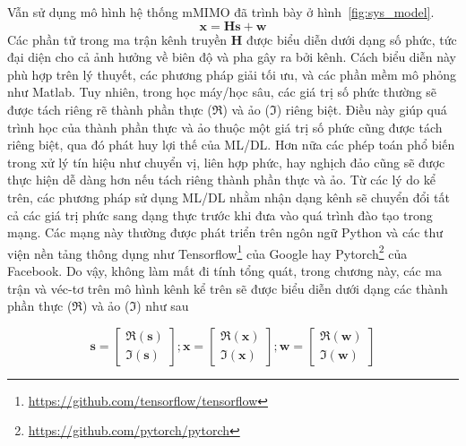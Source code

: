 Vẫn sử dụng mô hình hệ thống mMIMO đã trình bày ở hình~\ref{fig:sys_model}.
\begin{equation}
    \mathbf{x} = \mathbf{H} \mathbf{s} + \mathbf{w}
\end{equation}
Các phần tử trong ma trận kênh truyền $\mathbf{H}$ được biểu diễn dưới dạng số phức, tức đại diện cho cả ảnh hưởng về biên độ và pha gây ra bởi kênh. Cách biểu diễn này phù hợp trên lý thuyết, các phương pháp giải tối ưu, và các phần mềm mô phỏng như Matlab. Tuy nhiên, trong học máy/học sâu, các giá trị số phức thường sẽ được tách riêng rẽ thành phần thực ($\Re$) và ảo ($\Im$) riêng biệt. Điều này giúp quá trình học của thành phần thực và ảo thuộc một giá trị số phức cũng được tách riêng biệt, qua đó phát huy lợi thế của ML/DL. Hơn nữa các phép toán phổ biến trong xử lý tín hiệu như chuyển vị, liên hợp phức, hay nghịch đảo cũng sẽ được thực hiện dễ dàng hơn nếu tách riêng thành phần thực và ảo.
Từ các lý do kể trên, các phương pháp sử dụng ML/DL nhằm nhận dạng kênh sẽ chuyển đổi tất cả các giá trị phức sang dạng thực trước khi đưa vào quá trình đào tạo trong mạng. Các mạng này thường được phát triển trên ngôn ngữ Python và các thư viện nền tảng thông dụng như Tensorflow\footnote{\url{https://github.com/tensorflow/tensorflow}} của Google hay Pytorch\footnote{\url{https://github.com/pytorch/pytorch}} của Facebook. Do vậy, không làm mất đi tính tổng quát, trong chương này, các ma trận và véc-tơ trên mô hình kênh kể trên sẽ được biểu diễn dưới dạng các thành phần thực ($\Re$) và ảo ($\Im$) như sau

\begin{equation}
\label{eq:matrixtras1}
    \mathbf{s}=\left[\begin{array}{l}
    \Re(\mathbf{s}) \\
    \Im(\mathbf{s})
    \end{array}\right] ;
    \mathbf{x}=\left[\begin{array}{l}
    \Re(\mathbf{x}) \\
    \Im(\mathbf{x})
    \end{array}\right] ; 
    \mathbf{w}=\left[\begin{array}{l}
    \Re(\mathbf{w}) \\
    \Im(\mathbf{w})
    \end{array}\right]
\end{equation}

